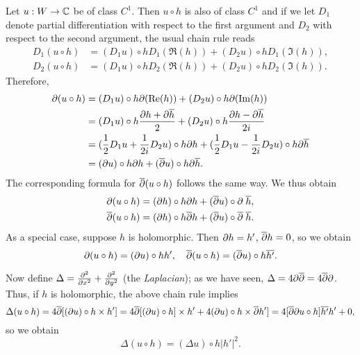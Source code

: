 \documentclass[a4paper,11pt]{article}
\begin{document}
Let $u : W \to {\mathbb C}$ be of class $C^1$.  Then $u \circ h$ is also of
class $C^1$ and if we let $D_1$ denote partial differentiation with
respect to the first argument and $D_2$ with respect to the second
argument, the usual chain rule reads
$$
\begin{aligned}
  D_1(u \circ h) &= (D_1 u) \circ h D_1 (\Re(h)) 
  + (D_2 u) \circ h D_1 (\Im(h)),\\
  D_2(u \circ h) &= (D_1 u) \circ h D_2 (\Re(h)) 
  + (D_2 u) \circ h D_2 (\Im(h)).  
\end{aligned}
$$
Therefore,
$$
\begin{aligned}
  \p(u\circ h) &= (D_1 u) \circ h \p(\Re(h)) + (D_2 u)\circ h
  \p(\Im(h))\\
  &= (D_1 u) \circ h \frac{\p h + \p \overline{h}}{2} 
  + (D_2 u)\circ h \frac{\p h - \p \overline{h}}{2i}\\
  &= (\frac{1}{2}D_1u + \frac{1}{2i}D_2 u)\circ h \p h
  + (\frac{1}{2}D_1u - \frac{1}{2i}D_2 u)\circ h \p \overline{h}\\
  &= (\p u) \circ h \p h + (\overline{\p} u) \circ h \p \overline{h}.
\end{aligned}
$$
The corresponding formula for $\overline{\partial}(u\circ h)$ follows the
same way.  We thus obtain
$$
\begin{aligned}
  \partial(u\circ h) &= (\partial h) \circ h \partial h + (\overline{\partial}u) \circ 
  \partial\;\overline{h},\\
  \overline{\partial}(u\circ h) &= (\partial h) \circ h \overline{\partial} h 
  + (\overline{\partial}u) \circ    \overline{\partial}\;\overline{h}.
\end{aligned}
$$
As a special case, suppose $h$ is holomorphic.  Then $\partial h = h'$,
$\overline{\partial} h = 0$, so we obtain
\begin{equation}
  \label{e:1}
  \partial(u\circ h) = (\partial u) \circ h h',\quad
  \overline{\partial}(u\circ h) = (\overline{\partial} u) \circ h 
  \overline{h'}.
\end{equation}

Now define $\Delta = \frac{\partial^2}{\partial x^2} + \frac{\partial^2}{\partial y^2}$ (the
\emph{Laplacian}); as we have seen, $\Delta = 4\partial \overline{\partial} 
= 4 \overline{\partial}\partial$. Thus, if $h$ is holomorphic, the above chain
rule implies
$$
\Delta(u \circ h) 
= 4\overline{\partial}[(\partial u)\circ h \times h']
= 4\overline{\partial}[(\partial u)\circ h] \times h'
+ 4(\partial u)\circ h \times \overline{\partial} h']
= 4[\overline{\partial}\partial u \circ h]\overline{h'}h' + 0,
$$
so we obtain
\begin{equation}
  \label{e:2}
  \Delta(u \circ h) = (\Delta u) \circ h |h'|^2.
\end{equation}
\end{document}
